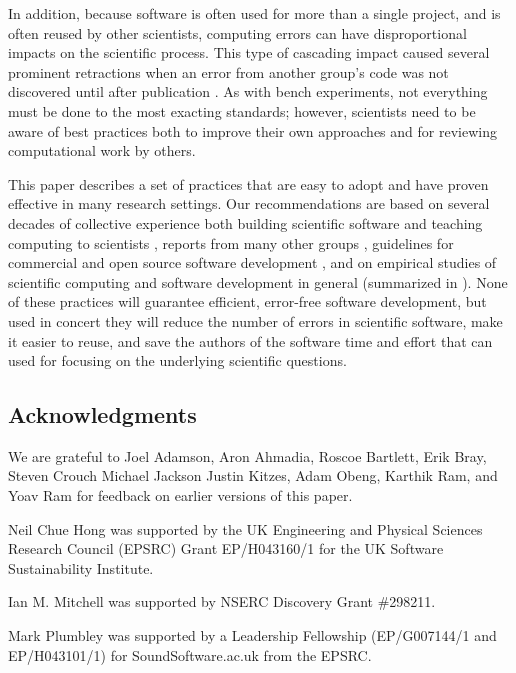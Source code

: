 \documentclass{article}
\begin{document}
In addition, because software is often used for more than a single
project, and is often reused by other scientists, computing errors can
have disproportional impacts on the scientific process. This type of
cascading impact caused several prominent retractions when an error
from another group's code was not discovered until after publication
\cite{merali2010}.  As with bench experiments, not everything must be
done to the most exacting standards; however, scientists need to be
aware of best practices both to improve their own approaches and for
reviewing computational work by others.

This paper describes a set of practices that are easy to adopt and
have proven effective in many research settings.  Our recommendations
are based on several decades of collective experience both building
scientific software and teaching computing to scientists
\cite{aranda2012,wilson2006b}, reports from many other groups
\cite{heroux2009,kane2003,kane2006,killcoyne2009,matthews2008,pitt-francis2008,pouillon2010},
guidelines for commercial and open source software development
\cite{spolsky2000,fogel2005}, and on empirical studies of scientific
computing \cite{carver2007,kelly2009,segal2005,segal2008a} and
software development in general (summarized in \cite{oram2010}). None
of these practices will guarantee efficient, error-free software
development, but used in concert they will reduce the number of errors
in scientific software, make it easier to reuse, and save the authors
of the software time and effort that can used for focusing on the
underlying scientific questions.

\subsection*{Acknowledgments}

We are grateful to
Joel Adamson,
Aron Ahmadia,
Roscoe Bartlett,
Erik Bray,
Steven Crouch
Michael Jackson
Justin Kitzes,
Adam Obeng,
Karthik Ram,
and
Yoav Ram
for feedback on earlier versions of this paper.

Neil Chue Hong was supported by the UK Engineering and Physical Sciences Research Council (EPSRC)
Grant EP/H043160/1 for the UK Software Sustainability Institute.

Ian M. Mitchell was supported by NSERC Discovery Grant \#298211.

Mark Plumbley was supported by a Leadership Fellowship (EP/G007144/1 and EP/H043101/1)
for SoundSoftware.ac.uk from the EPSRC.
\end{document}
